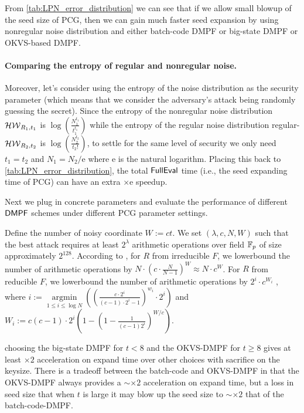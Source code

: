 
From \cref{tab:LPN_error_distribution} we can see that if we allow small blowup of the seed size of PCG, then we can gain much faster seed expansion by using nonregular noise distribution and either batch-code DMPF or big-state DMPF or OKVS-based DMPF. 

\paragraph{Comparing the entropy of regular and nonregular noise.}Moreover, let's consider using the entropy of the noise distribution as the security parameter (which means that we consider the adversary's attack being randomly guessing the secret). Since the entropy of the nonregular noise distribution $\mathcal{HW}_{R_1,t_1}$ is $\log(\frac{N_1^{t_1}}{t_1^{t_1}})$ while the entropy of the regular noise distribution regular-$\mathcal{HW}_{R_2,t_2}$ is $\log(\frac{N_2^{t_2}}{t_2!})$, to settle for the same level of security we only need $t_1=t_2$ and $N_1 = N_2/\mathrm{e}$ where $\mathrm{e}$ is the natural logarithm. Placing this back to \cref{tab:LPN_error_distribution}, the total ${\sf FullEval}$ time (i.e., the seed expanding time of PCG) can have an extra $\times \mathrm{e}$ speedup. 

Next we plug in concrete parameters and evaluate the performance of different ${\sf DMPF}$ schemes under different PCG parameter settings. 

Define the number of noisy coordinate $W:=ct$. We set $(\lambda, c, N, W)$ such that the best attack requires at least $2^\lambda$ arithmetic operations over field $\mathbb{F}_p$ of size approximately $2^{128}$. According to \cite{cryptoeprint:2022/1035}, for $R$ from irreducible $F$, we lowerbound the number of arithmetic operations by $N\cdot (c\cdot \frac{N}{N-1})^W\approx N\cdot c^W$. For $R$ from reducible $F$, we lowerbound the number of arithmetic operations by $2^i\cdot c^{W_i}$ , where $i:=\mathop{\arg\min}\limits_{1\le i\le \log N}\left((\frac{c\cdot 2^i}{(c-1)\cdot 2^i-1})^{w_i}\cdot 2^i\right)$ and $W_i:=c(c-1)\cdot 2^i\left(1-(1-\frac{1}{(c-1)2^i})^{W/c}\right)$. 


 choosing the big-state DMPF for $t<8$ and the OKVS-DMPF for $t\ge 8$ gives at least $\times 2$ acceleration on expand time over other choices with sacrifice on the keysize. There is a tradeoff between the batch-code and OKVS-DMPF in that the OKVS-DMPF always provides a $\sim\times 2$ acceleration on expand time, but a loss in seed size that when $t$ is large it may blow up the seed size to $\sim \times 2$ that of the batch-code-DMPF. 

